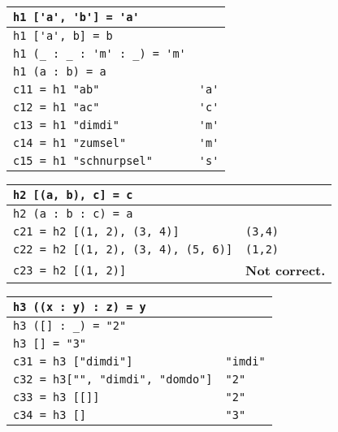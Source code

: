 \begin{tabularx}{\linewidth}{|l|X|}
  \hline
  \lstinline|h1 ['a', 'b'] = 'a'| & \\
  \hline
  \lstinline|h1 ['a', b] = b| & \\
  \hline
  \lstinline|h1 (_ : _ : 'm' : _) = 'm'| & \\
  \hline
  \lstinline|h1 (a : b) = a| & \\
  \hline
  \lstinline|c11 = h1 "ab"| & \lstinline|'a'|\\
  \hline
  \lstinline|c12 = h1 "ac"| & \lstinline|'c'|\\
  \hline
  \lstinline|c13 = h1 "dimdi"| & \lstinline|'m'|\\
  \hline
  \lstinline|c14 = h1 "zumsel"| & \lstinline|'m'|\\
  \hline
  \lstinline|c15 = h1 "schnurpsel"| & \lstinline|'s'|\\
  \hline
\end{tabularx}
\begin{tabularx}{\linewidth}{|l|X|}
  \hline
  \lstinline|h2 [(a, b), c] = c| & \\
  \hline
  \lstinline|h2 (a : b : c) = a| & \\
  \hline
  \lstinline|c21 = h2 [(1, 2), (3, 4)]| & \lstinline|(3,4)|\\
  \hline
  \lstinline|c22 = h2 [(1, 2), (3, 4), (5, 6)]| & \lstinline|(1,2)|\\
  \hline
  \lstinline|c23 = h2 [(1, 2)]| & \textbf{Not correct.}\\
  \hline
\end{tabularx}
\begin{tabularx}{\linewidth}{|X|X|}
  \hline
  \lstinline|h3 ((x : y) : z) = y| & \\
  \hline
  \lstinline|h3 ([] : _) = "2"| & \\
  \hline
  \lstinline|h3 [] = "3"| & \\
  \hline
  \lstinline|c31 = h3 ["dimdi"]| & \lstinline|"imdi"|\\
  \hline
  \lstinline|c32 = h3["", "dimdi", "domdo"]| & \lstinline|"2"|\\
  \hline
  \lstinline|c33 = h3 [[]]| & \lstinline|"2"|\\
  \hline
  \lstinline|c34 = h3 []| & \lstinline|"3"|\\
  \hline
\end{tabularx}
